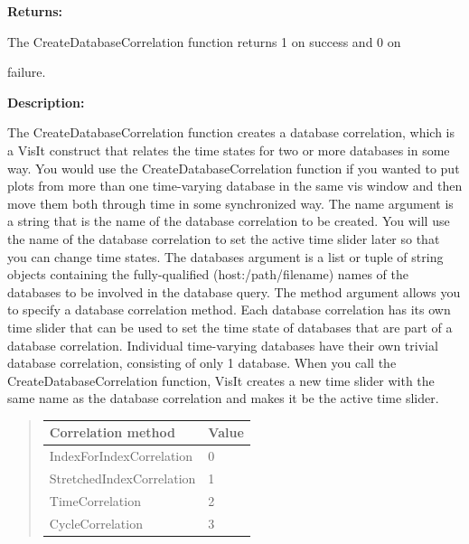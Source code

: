 \documentclass[letterpaper,10pt,english]{sphinxmanual}
\begin{document}
\begin{DUlineblock}{0em}
\item[] 
\item[] \textbf{Returns:}
\item[] The CreateDatabaseCorrelation function returns 1 on success and 0 on
\item[] failure.
\item[] 
\item[] \textbf{Description:}
\item[] The CreateDatabaseCorrelation function creates a database correlation,
which is a VisIt construct that relates the time states for two or more
databases in some way. You would use the CreateDatabaseCorrelation function
if you wanted to put plots from more than one time-varying database in the
same vis window and then move them both through time in some synchronized
way. The name argument is a string that is the name of the database
correlation to be created. You will use the name of the database
correlation to set the active time slider later so that you can change time
states. The databases argument is a list or tuple of string objects
containing the fully-qualified (host:/path/filename) names of the databases
to be involved in the database query. The method argument allows you to
specify a database correlation method.
Each database correlation has its own time slider that can be used to set
the time state of databases that are part of a database correlation.
Individual time-varying databases have their own trivial database
correlation, consisting of only 1 database. When you call the
CreateDatabaseCorrelation function, VisIt creates a new time slider with
the same name as the database correlation and makes it be the active time
slider.
\item[] 
\end{DUlineblock}
\begin{quote}

\begin{tabulary}{\linewidth}{|L|L|}
\hline

\textbf{Correlation method}
 & 
Value
\\
\hline
IndexForIndexCorrelation
 & 
0
\\
\hline
StretchedIndexCorrelation
 & 
1
\\
\hline
TimeCorrelation
 & 
2
\\
\hline
CycleCorrelation
 & 
3
\\
\hline\end{tabulary}

\end{quote}
\end{document}
